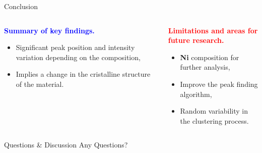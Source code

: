 \documentclass[aspectratio=169]{beamer}
\begin{document}
\begin{frame}{Conclusion}
  \begin{columns}
    \begin{column}{0.5\textwidth}
      \centering
      \textbf{\textcolor{blue}{Summary of key findings.}}
      \begin{itemize}
        \item Significant peak position and intensity variation depending on the composition,
        \item Implies a change in the cristalline structure of the material. 
      \end{itemize}
    \end{column}
    
    \begin{column}{0.5\textwidth}
      \centering
      \textbf{\textcolor{red}{Limitations and areas for future research.}}
      \begin{itemize}
        \item \textbf{Ni} composition for further analysis,
        \item Improve the peak finding algorithm,
        \item Random variability in the clustering process.
      \end{itemize}
    \end{column}
  \end{columns}
\end{frame}



\begin{frame}{Questions \& Discussion}
    \centering
    \Huge Any Questions?
\end{frame}
\end{document}

